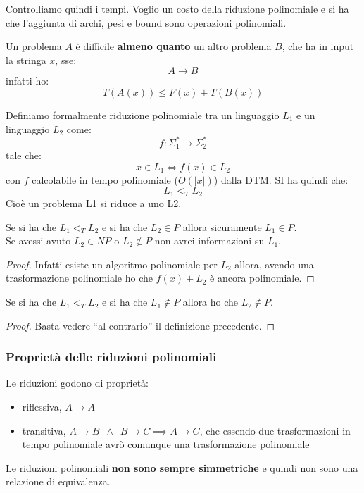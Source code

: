 Controlliamo quindi i tempi. Voglio un costo della riduzione polinomiale e si ha
che l'aggiunta di archi, pesi e bound sono operazioni polinomiali.
\begin{definizione}
 Un problema $A$ è difficile \textbf{almeno quanto} un altro problema $B$, che ha in input la stringa
  $x$, sse:
  \[A\to B\]
  infatti ho:
  \[T(A(x))\leq F(x)+T(B(x))\]
\end{definizione}
\begin{definizione}
  Definiamo formalmente riduzione polinomiale tra un linguaggio $L_1$ e un
  linguaggio $L_2$ come:
  \[f:\Sigma_1^*\to \Sigma_2^*\]
  tale che:
  \[x\in L_1\iff f(x)\in L_2\]
  con $f$ calcolabile in tempo polinomiale ($O(|x|)$) dalla DTM. SI ha quindi
  che:
  \[L_1<_T L_2\]
  Cioè un problema L1 si riduce a uno L2.
\end{definizione}
\begin{definizione}
  Se si ha che $L_1<_T L_2$ e si ha che $L_2\in P$ allora sicuramente $L_1\in
  P$.\\
  Se avessi avuto $L_2\in NP$ o $L_2\not\in P$ non avrei informazioni su $L_1$. 

\end{definizione}
\begin{proof}
  Infatti esiste un algoritmo polinomiale per $L_2$ allora, avendo una
  trasformazione polinomiale  ho che $f(x)+L_2$ è ancora polinomiale.
\end{proof}
\begin{definizione}
  Se si ha che $L_1<_T L_2$ e si ha che $L_1\not\in P$ allora ho che
  $L_2\not\in P$.
\end{definizione}
\begin{proof}
  Basta vedere ``al contrario'' il definizione precedente.
\end{proof}
\subsubsection{Proprietà delle riduzioni polinomiali}
Le riduzioni godono di proprietà:
\begin{itemize}
  \item riflessiva, $A\to A$
  \item transitiva, $A\to B\,\,\,\land \,\,\,B\to C\implies A\to C$, che essendo
  due trasformazioni in tempo polinomiale avrò comunque una trasformazione
  polinomiale 
\end{itemize}
Le riduzioni polinomiali \textbf{non sono sempre simmetriche} e quindi non sono
una relazione di equivalenza.\\
